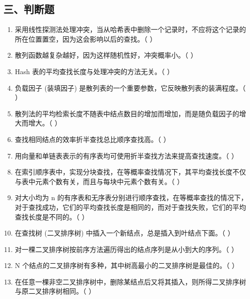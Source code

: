 \documentclass[12pt, a4paper]{article}
\begin{document}
\subsection*{三、判断题}
\begin{enumerate}
    \item 采用线性探测法处理冲突，当从哈希表中删除一个记录时，不应将这个记录的所在位置置空，因为这会影响以后的查找。（ ）
    \item 散列函数越复杂越好，因为这样随机性好，冲突概率小。（ ）
    \item Hash 表的平均查找长度与处理冲突的方法无关。（ ）
    \item 负载因子 (装填因子) 是散列表的一个重要参数，它反映散列表的装满程度。（ ）
    \item 散列法的平均检索长度不随表中结点数目的增加而增加，而是随负载因子的增大而增大。（ ）
    \item 查找相同结点的效率折半查找总比顺序查找高。（ ）
    \item 用向量和单链表表示的有序表均可使用折半查找方法来提高查找速度。（ ）
    \item 在索引顺序表中，实现分块查找，在等概率查找情况下，其平均查找长度不仅与表中元素个数有关，而且与每块中元素个数有关。（ ）
    \item 对大小均为 n 的有序表和无序表分别进行顺序查找，在等概率查找的情况下，对于查找成功，它们的平均查找长度是相同的，而对于查找失败，它们的平均查找长度是不同的。（ ）
    \item 在查找树 (二叉排序树) 中插入一个新结点，总是插入到叶结点下面。（ ）
    \item 对一棵二叉排序树按前序方法遍历得出的结点序列是从小到大的序列。（ ）
    \item N 个结点的二叉排序树有多种，其中树高最小的二叉排序树是最佳的。（ ）
    \item 在任意一棵非空二叉排序树中，删除某结点后又将其插入，则所得二叉排序树与原二叉排序树相同。（ ）
\end{enumerate}
\end{document}

